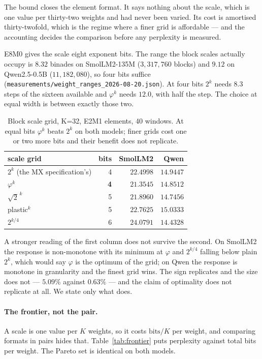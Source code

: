 \documentclass[11pt]{article}
\theoremstyle{definition}
\begin{document}
The bound closes the element format. It says nothing about the scale, which is
one value per thirty-two weights and had never been varied. Its cost is
amortised thirty-twofold, which is the regime where a finer grid is affordable
--- and the accounting decides the comparison before any perplexity is measured.

E8M0 gives the scale eight exponent bits. The range the block scales actually
occupy is $8.32$ binades on SmolLM2-135M ($3{,}317{,}760$ blocks) and $9.12$
on Qwen2.5-0.5B ($11{,}182{,}080$), so four bits suffice
(\texttt{measurements/weight\_ranges\_2026-08-20.json}). At four bits $2^{k}$ needs $8.3$ steps of
the sixteen available and $\varphi^{k}$ needs $12.0$, with half the step. The
choice at equal width is between exactly those two.

\begin{table}[t]\centering
\caption{Block scale grid, K=32, E2M1 elements, 40 windows. At equal bits
$\varphi^{k}$ beats $2^{k}$ on both models; finer grids cost one or two more
bits and their benefit does not replicate.}
\label{tab:scalegrid}
\begin{tabular}{lrrr}
\toprule
scale grid & bits & SmolLM2 & Qwen \\
\midrule
$2^{k}$ (the MX specification's) & 4 & $22.4998$ & $14.9447$ \\
$\varphi^{k}$                    & \textbf{4} & $\mathbf{21.3545}$ & $\mathbf{14.8512}$ \\
$\sqrt{2}^{\,k}$                 & 5 & $21.8960$ & $14.7456$ \\
plastic$^{k}$                    & 5 & $22.7625$ & $15.0333$ \\
$2^{k/4}$                        & 6 & $24.0791$ & $14.4328$ \\
\bottomrule
\end{tabular}
\end{table}

A stronger reading of the first column does not survive the second. On SmolLM2
the response is non-monotone with its minimum at $\varphi$ and $2^{k/4}$ falling
below plain $2^{k}$, which would say $\varphi$ is the optimum of the grid; on
Qwen the response is monotone in granularity and the finest grid wins. The sign
replicates and the size does not --- $5.09\%$ against $0.63\%$ --- and the claim
of optimality does not replicate at all. We state only what does.

\paragraph{The frontier, not the pair.} A scale is one value per $K$ weights,
so it costs $\mathrm{bits}/K$ per weight, and comparing formats in pairs hides
that. Table~\ref{tab:frontier} puts perplexity against total bits per weight.
The Pareto set is identical on both models.
\end{document}
